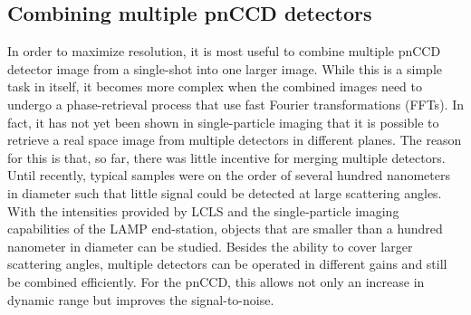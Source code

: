 \subsection{Combining multiple pnCCD detectors}\label{sec:combination-of-images}
In order to maximize resolution, it is most useful to combine multiple pnCCD detector image from a single-shot into one larger image. While this is a simple task in itself, it becomes more complex when the combined images need to undergo a phase-retrieval process that use fast Fourier transformations (FFTs). In fact, it has not yet been shown in single-particle imaging that it is possible to retrieve a real space image from multiple detectors in different planes.
The reason for this is that, so far, there was little incentive for merging multiple detectors. Until recently, typical samples were on the order of several hundred nanometers in diameter such that little signal could be detected at large scattering angles. With the intensities provided by LCLS and the single-particle imaging capabilities of the LAMP end-station, objects that are smaller than a hundred nanometer in diameter can be studied.
Besides the ability to cover larger scattering angles, multiple detectors can be operated in different gains and still be combined efficiently. For the pnCCD, this allows not only an increase in dynamic range but improves the signal-to-noise.\\[1\baselineskip]
%
